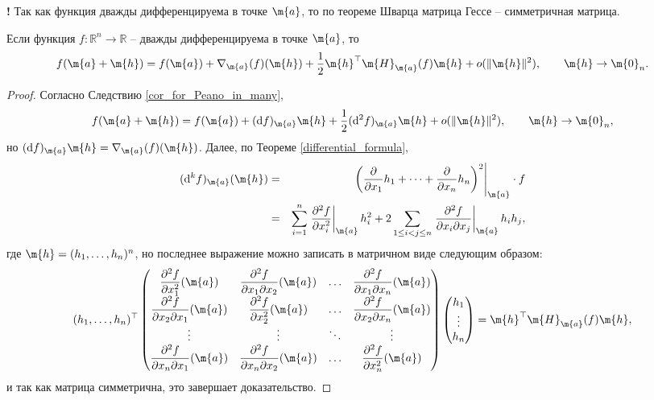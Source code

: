 \begin{mydanger}{\bf{!}}
    Так как функция дважды дифференцируема в точке $\m{a}$, то по теореме Шварца матрица Гессе -- симметричная матрица.
\end{mydanger}

\begin{theorem}\label{Tayl_for_2}
    Если функция $f:\mathbb{R}^n \to \mathbb{R}$ -- дважды дифференцируема в точке $\m{a}$, то
    \[
     f(\m{a} + \m{h}) =f(\m{a}) + \nabla_\m{a}(f)(\m{h}) + \frac{1}{2} \m{h}^\top \m{H}_\m{a}(f) \m{h} + o(\|\m{h}\|^2), \qquad \m{h} \to \m{0}_n.
    \]
\end{theorem}
\begin{proof}
    Согласно Следствию \ref{cor_for_Peano_in_many}, 
    \[
     f(\m{a} + \m{h}) = f(\m{a}) + (\mathrm{d}f)_\m{a} \m{h} + \frac{1}{2} (\mathrm{d}^2f)_\m{a}\m{h} + o(\| \m{h} \|^2), \qquad \m{h} \to \m{0}_n,
    \]
    но $(\mathrm{d}f)_\m{a} \m{h} = \nabla_\m{a}(f)(\m{h})$. Далее, по Теореме \ref{differential_formula},
\begin{eqnarray*}
    (\mathrm{d}^kf)_\m{a}(\m{h})  &=& \left.\left(\frac{\partial}{\partial x_1} h_1 + \cdots + \frac{\partial }{\partial x_n}h_n \right)^2\right|_{\m{a}} \cdot f \\
    &=& \sum_{i=1}^n \left.\dfrac{\partial^2 f}{\partial x_i^2} \right|_\m{a} h_i^2 + 2 \sum_{1\le i < j \le n}  \left.\dfrac{\partial^2 f}{\partial x_i \partial x_j} \right|_{\m{a}} h_ih_j,
\end{eqnarray*}
где $\m{h} = (h_1, \ldots, h_n)^n$, но последнее выражение можно записать в матричном виде следующим образом:
\[
 (h_1, \ldots, h_n)^\top \begin{pmatrix}
         \dfrac{\partial^2 f}{\partial x_1^2}(\m{a}) & \dfrac{\partial^2 f}{\partial x_1 \partial x_2}(\m{a}) &\ldots & \dfrac{\partial^2 f}{\partial x_1 \partial x_n}(\m{a}) \\
         \dfrac{\partial^2 f}{\partial x_2 \partial x_1}(\m{a}) & \dfrac{\partial^2 f}{\partial x_2^2}(\m{a}) & \ldots & \dfrac{\partial^2 f}{\partial x_2 \partial x_n}(\m{a}) \\
         \vdots & \vdots & \ddots & \vdots \\
         \dfrac{\partial^2 f}{\partial x_n \partial x_1}(\m{a}) & \dfrac{\partial^2 f}{\partial x_n \partial x_2}(\m{a}) & \ldots &\dfrac{\partial^2 f}{ \partial x_n^2}(\m{a})
     \end{pmatrix} \begin{pmatrix}
         h_1 \\ \vdots \\ h_n
     \end{pmatrix}  =  \m{h}^\top \m{H}_\m{a}(f) \m{h} ,
\]
и так как матрица симметрична, это завершает доказательство.
\end{proof}



